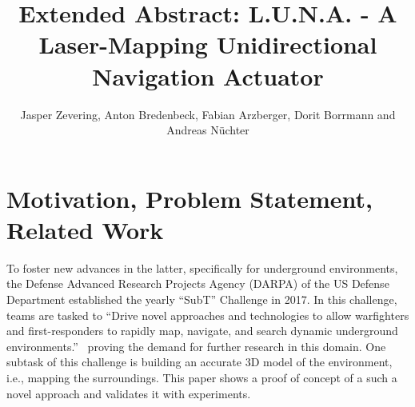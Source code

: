 \documentclass[graybox]{svmono}
\newcommand{\1}{\mathbbm{1}}                 %
\begin{document}
\title{Extended Abstract:           L.U.N.A. - A Laser-Mapping Unidirectional Navigation Actuator} 
\author{Jasper Zevering, Anton Bredenbeck, Fabian Arzberger,
  Dorit Borrmann and Andreas N\"uchter}


%
%
\maketitle


\section{Motivation, Problem Statement, Related Work}

To foster new advances in the latter, specifically for underground environments, the  Defense Advanced Research Projects Agency (DARPA) of the US Defense Department established the yearly ``SubT'' Challenge in 2017.
In this challenge, teams are tasked to ``Drive novel approaches and technologies to allow warfighters and first-responders to rapidly map, navigate, and search dynamic underground environments.''~\cite{allen} proving the demand for further research in this domain.
One subtask of this challenge is building an accurate 3D model of the environment, i.e., mapping the surroundings. 
This paper shows a proof of concept of a such a novel approach and validates it with experiments.
\end{document}
